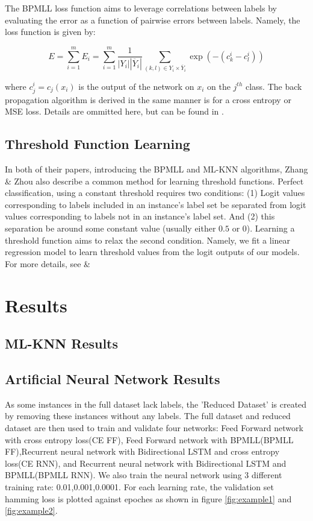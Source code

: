 \documentclass[11pt]{article}
\begin{document}
The BPMLL loss function aims to leverage correlations between labels by evaluating the error as a function of pairwise errors between labels. Namely, the loss function is given by:

$$
    E = \sum_{i = 1}^m E_i = \sum_{i = 1}^m \frac{1}{|Y_i| |\overline{Y}_i|} \sum_{(k,l) \in Y_i \times \overline{Y}_i} \exp(-(c_k^i - c_l^i))
$$

where $c_j^i = c_j(x_i)$ is the output of the network on $x_i$ on the $j^{th}$ class. The back propagation algorithm is derived in the same manner is for a cross entropy or MSE loss. Details are ommitted here, but can be found in \autocite{bpmll}.
  
\subsection{Threshold Function Learning}

In both of their papers, introducing the BPMLL and ML-KNN algorithms, Zhang \& Zhou also describe a common method for learning threshold functions. Perfect classification, using a constant threshold requires two conditions: (1) Logit values corresponding to labels included in an instance's label set  be separated from logit values corresponding to labels not in an instance's label set. And (2) this separation be around some constant value (usually either $0.5$ or $0$). Learning a threshold function aims to relax the second condition. Namely, we fit a linear regression model to learn threshold values from the logit outputs of our models. For more details, see \autocite{bpmll} \& \autocite{mlknn} 
\section{Results}

\subsection{ML-KNN Results}

\subsection{Artificial Neural Network Results}

As some instances in the full dataset lack labels,  the 'Reduced Dataset' is created by removing these instances without any labels. The full dataset and reduced dataset are then used to train and validate four networks: Feed Forward network with cross entropy loss(CE FF), Feed Forward network with BPMLL(BPMLL FF),Recurrent neural network with Bidirectional LSTM and  cross entropy loss(CE RNN), and Recurrent neural network with Bidirectional LSTM and BPMLL(BPMLL RNN). We also train the neural network using 3 different training rate: 0.01,0.001,0.0001. For each learning rate, the validation set hamming loss is plotted against epoches as shown in figure \ref{fig:example1} and \ref{fig:example2}.
\end{document}
